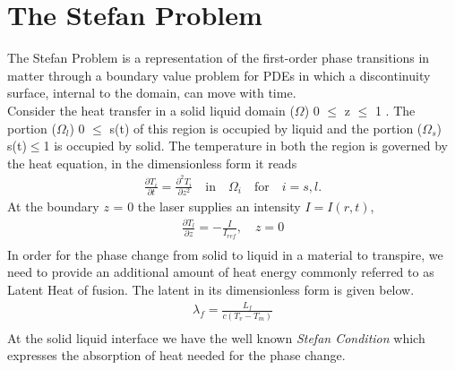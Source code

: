  \section{The Stefan Problem \label{sec:The Stefan Approach}}
 The Stefan Problem is a representation of the first-order phase transitions in matter through a boundary value problem for PDEs in which a discontinuity surface, internal to the domain, can move with time\cite{salvatori2009stefan}.\\
 Consider the heat transfer in a solid liquid domain ($\Omega$) 0 $\leq$ z $\leq$ 1 . The portion ($\Omega_l$) 0 $\leq$ s(t) of this region is occupied by liquid and the portion ($\Omega_s$) s(t)$\leq$1 is occupied by solid. The temperature in both the region is governed by the heat equation, in the dimensionless form it reads\\
 \begin{subequations}
     \begin{align}
         \frac{\partial T_i}{\partial t} = \frac{\partial^2 T_i}{\partial z^2} \quad \text{in}\quad \Omega_i \quad \text{for}\quad i = s,l. \label{eq:Stefan_Heat_Transfer}
         \end{align}
 \end{subequations}
         At the boundary $z$ = 0 the laser supplies an intensity $I = I(r,t)$, \\
\begin{subequations}
    \begin{align}
         \frac{\partial T_l}{\partial z} = -\frac{I}{I_{ref}}, \quad z = 0 \label{eq:Stefan_Boundary1}\\ \nonumber
         \end{align}
 \end{subequations}
         In order for the phase change from solid to liquid in a material to transpire, we need to provide an additional amount of heat energy commonly referred to as Latent Heat of fusion. The latent in its dimensionless form is given below.\\
\begin{subequations}
    \begin{align}
            \lambda_f = \frac{L_f}{c(T_v-T_m)}
            \\ \nonumber
    \end{align}
\end{subequations}
At the solid liquid interface we have the well known \textit{Stefan Condition} which expresses the absorption of heat needed for the phase change.\\
